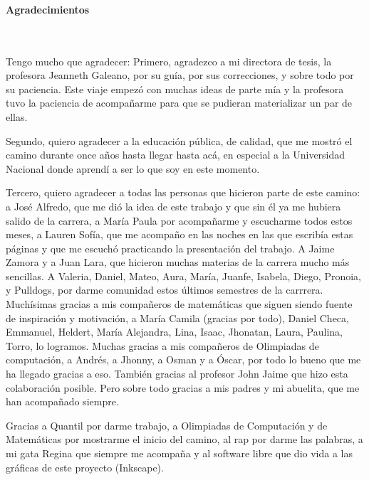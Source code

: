 \newpage{\pagestyle{empty}\cleardoublepage}

\newpage
\thispagestyle{empty} \textbf{}\normalsize
\\\\\\%
\textbf{\LARGE Agradecimientos}
\\\\
Tengo mucho que agradecer: Primero, agradezco a mi directora de tesis, la profesora Jeanneth Galeano, por su gu\'ia, por sus correcciones, y sobre todo por su paciencia. Este viaje empez\'o con muchas ideas de parte m\'ia y la profesora tuvo la paciencia de acompa\~narme para que se pudieran materializar un par de ellas. 

Segundo, quiero agradecer a la educaci\'on p\'ublica, de calidad, que me mostr\'o el camino durante once a\~nos hasta llegar hasta ac\'a, en especial a la Universidad Nacional donde aprend\'i a ser lo que soy en este momento.

Tercero, quiero agradecer a todas las personas que hicieron parte de este camino: a Jos\'e Alfredo, que me di\'o la idea de este trabajo y que sin \'el ya me hubiera salido de la carrera, a Mar\'ia Paula por acompa\~narme y escucharme todos estos meses, a Lauren Sof\'ia, que me acompa\~no en las noches en las que escrib\'ia estas p\'aginas y que me escuch\'o practicando la presentaci\'on del trabajo. A Jaime Zamora y a Juan Lara, que hicieron muchas materias de la carrera mucho m\'as sencillas. A Valeria, Daniel, Mateo, Aura, Mar\'ia, Juanfe, Isabela, Diego, Pronoia, y Pulldogs, por darme comunidad estos \'ultimos semestres de la carrrera. Much\'isimas gracias a mis compañeros de matemáticas que siguen siendo fuente de inspiración y motivación, a María Camila (gracias por todo), Daniel Checa, Emmanuel, Heldert, María Alejandra, Lina, Isaac, Jhonatan, Laura, Paulina, Torro, lo logramos. Muchas gracias a mis compañeros de Olimpiadas de computación, a Andrés, a Jhonny, a Osman y a Óscar, por todo lo bueno que me ha llegado gracias a eso. También gracias al profesor John Jaime que hizo esta colaboración posible. Pero sobre todo gracias a mis padres y mi abuelita, que me han acompañado siempre.

Gracias a Quantil por darme trabajo, a Olimpiadas de Computaci\'on y de Matem\'aticas por mostrarme el inicio del camino, al rap por darme las palabras, a mi gata Regina que siempre me acompaña y al software libre que dio vida a las gráficas de este proyecto (Inkscape).

